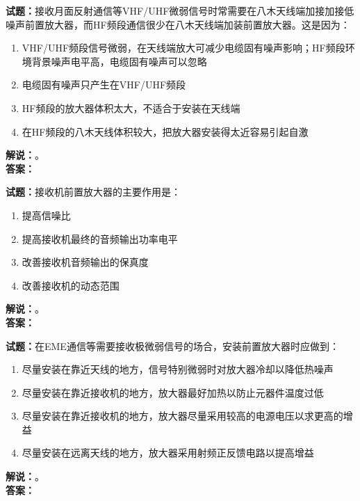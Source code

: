 \documentclass{ctexbook}
\begin{document}
\vspace{\baselineskip}

\noindent\textbf{试题：}接收月面反射通信等VHF/UHF微弱信号时常需要在八木天线端加接加接低噪声前置放大器，而HF频段通信很少在八木天线端加装前置放大器。这是因为：
\begin{enumerate}[leftmargin=3em]
  \item VHF/UHF频段信号微弱，在天线端放大可减少电缆固有噪声影响；HF频段环境背景噪声电平高，电缆固有噪声可以忽略
  \item 电缆固有噪声只产生在VHF/UHF频段
  \item HF频段的放大器体积太大，不适合于安装在天线端
  \item 在HF频段的八木天线体积较大，把放大器安装得太近容易引起自激
\end{enumerate}
\noindent\textbf{解说：}\textbf{}。\\\noindent\textbf{答案：}

\vspace{\baselineskip}

\noindent\textbf{试题：}接收机前置放大器的主要作用是：
\begin{enumerate}[leftmargin=3em]
  \item 提高信噪比
  \item 提高接收机最终的音频输出功率电平
  \item 改善接收机音频输出的保真度
  \item 改善接收机的动态范围
\end{enumerate}
\noindent\textbf{解说：}\textbf{}。\\\noindent\textbf{答案：}

\vspace{\baselineskip}

\noindent\textbf{试题：}在EME通信等需要接收极微弱信号的场合，安装前置放大器时应做到：
\begin{enumerate}[leftmargin=3em]
  \item 尽量安装在靠近天线的地方，信号特别微弱时对放大器冷却以降低热噪声
  \item 尽量安装在靠近接收机的地方，放大器最好加热以防止元器件温度过低
  \item 尽量安装在靠近接收机的地方，放大器尽量采用较高的电源电压以求更高的增益
  \item 尽量安装在远离天线的地方，放大器采用射频正反馈电路以提高增益
\end{enumerate}
\noindent\textbf{解说：}\textbf{}。\\\noindent\textbf{答案：}

\vspace{\baselineskip}
\end{document}
